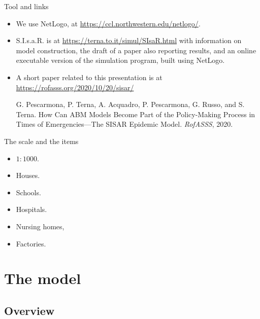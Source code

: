 \documentclass[8pt]{beamer}
\begin{document}
\begin{frame}{Tool and links}

  \begin{itemize}

\item We use NetLogo, at \url{https://ccl.northwestern.edu/netlogo/}.

 \item
 
S.I.s.a.R. is at \url{https://terna.to.it/simul/SIsaR.html} with information on model construction, the draft of a paper also reporting results, and an online executable version of the simulation program, built using NetLogo.

 \item
 A short paper related to this presentation is at \url{https://rofasss.org/2020/10/20/sisar/}
 
 G. Pescarmona, P. Terna, A. Acquadro, P. Pescarmona, G. Russo, and S. Terna. How Can ABM Models Become Part of the Policy-Making Process in Times of Emergencies---The SISAR Epidemic Model. \emph{RofASSS}, 2020.

 \end{itemize}
\end{frame}

\begin{frame}{The scale and the items}

\begin{itemize}

\item $1:1000$.

\bigskip

\item Houses.
\item Schools.
\item Hospitals.
\item Nursing homes,
\item Factories.

\end{itemize}

\end{frame}
\section{The model}

\subsection{Overview}
\end{document}

